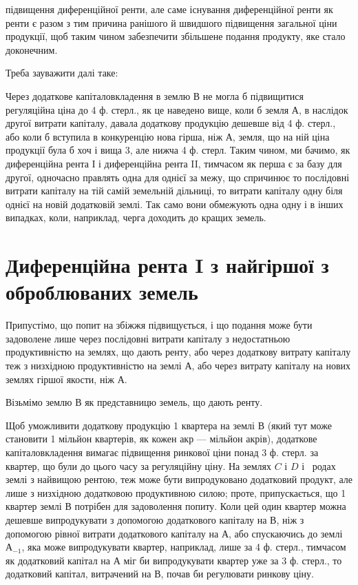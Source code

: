 \parcont{}  %
підвищення диференційної ренти, але саме існування диференційної ренти як
ренти є разом з тим причина ранішого й швидшого підвищення загальної ціни
продукції, щоб таким чином забезпечити збільшене подання продукту, яке стало доконечним.

Треба зауважити далі таке:

Через додаткове капіталовкладення в землю $В$ не могла б підвищитися
регуляційна ціна до 4 ф. стерл., як це наведено вище, коли б земля $А$, в наслідок
другої витрати капіталу, давала додаткову продукцію дешевше від 4 ф.
стерл., або коли б вступила в конкуренцію нова гірша, ніж $А$, земля, що на
ній ціна продукції була б хоч і вища 3, але нижча 4 ф. стерл. Таким чином,
ми бачимо, як диференційна рента І і диференційна рента II, тимчасом як
перша є за базу для другої, одночасно правлять одна для однієї за межу, що
спричинює то послідовні витрати капіталу на тій самій земельній дільниці, то
витрати капіталу одну біля однієї на новій додатковій землі. Так само вони
обмежують одна одну і в інших випадках, коли, наприклад, черга доходить до
кращих земель.

\section{Диференційна рента I з найгіршої з оброблюваних земель}

Припустімо, що попит на збіжжя підвищується, і що подання може бути
задоволене лише через послідовні витрати капіталу з недостатньою продуктивністю
на землях, що дають ренту, або через додаткову витрату капіталу
теж з низхідною продуктивністю на землі $А$, або через витрату капіталу на
нових землях гіршої якости, ніж $А$.

Візьмімо землю $В$ як представницю земель, що дають ренту.

Щоб уможливити додаткову продукцію 1 квартера на землі $В$ (який
тут може становити 1 мільйон квартерів, як кожен акр — мільйон акрів), додаткове
капіталовкладення вимагає підвищення ринкової ціни понад 3 ф. стерл.
за квартер, що були до цього часу за регуляційну ціну. На землях $C$ і $D$ і~ родах землі з найвищою рентою, теж може бути випродуковано додатковий
продукт, але лише з низхідною додатковою продуктивною силою; проте,
припускається, що 1 квартер землі $В$ потрібен для задоволення попиту.
Коли цей один квартер можна дешевше випродукувати з допомогою додаткового
капіталу на $В$, ніж з допомогою рівної витрати додаткового капіталу
на $А$, або спускаючись до землі $А_{-1}$, яка може випродукувати квартер, наприклад,
лише за 4 ф. стерл., тимчасом як додатковий капітал на $А$ міг би випродукувати
квартер уже за 3 ф. стерл., то додатковий капітал, витрачений на
$В$, почав би регулювати ринкову ціну.

